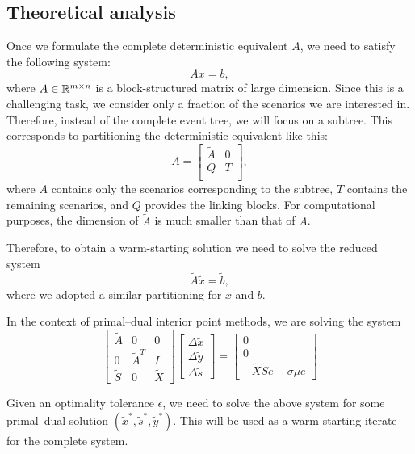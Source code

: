 \subsection{Theoretical analysis}

Once we formulate the complete deterministic equivalent $A$, we need 
to satisfy the following system:
\[
Ax=b,
\]
where $A\in \mathbb{R}^{m\times n}$ is a block-structured matrix of 
large dimension. Since this is a challenging task, we consider 
only a fraction of the scenarios we are interested in. Therefore, 
instead of the complete event tree, we will focus on a subtree. 
This corresponds to partitioning the deterministic equivalent 
like this:
\[
A = \left[ \begin{array}{cc}
    \tilde{A} & 0 \\ Q & T \\
    \end{array} \right],
\]
where $\tilde{A}$ contains only the scenarios corresponding 
to the subtree, $T$ contains the remaining scenarios, and $Q$ 
provides the linking blocks. For computational purposes, the 
dimension of $\tilde{A}$ is much smaller than that of $A$.

Therefore, to obtain a warm-starting solution we need to solve 
the reduced system
\[
\tilde{A}\tilde{x}=\tilde{b},
\]
where we adopted a similar partitioning for $x$ and $b$.

In the context of primal--dual interior point methods, we are 
solving the system
\[
\left[ \begin{array}{ccc}
    \tilde{A} & 0 & 0 \\
    0 & \tilde{A}^T & I \\
    \tilde{S} & 0 & \tilde{X}
    \end{array} \right]
\left[ \begin{array}{c}
    \Delta\tilde{x} \\ \Delta\tilde{y} \\ \Delta\tilde{s}
\end{array} \right] = 
\left[ \begin{array}{c}
      0 \\ 0 \\ -\tilde{X}\tilde{S}e - \sigma\mu e
\end{array} \right]
\]

Given an optimality tolerance $\epsilon$, we need to solve 
the above system for some primal--dual solution 
$(\tilde{x}^*, \tilde{s}^*, \tilde{y}^*)$. This will be used 
as a warm-starting iterate for the complete system.

